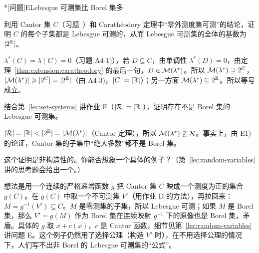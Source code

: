 \begin{probleme}*[问题]{E}{Lebesgue 可测集比 Borel 集多}
\begin{questions}
\item 利用 Cantor 集 $C$（习题~）和 Carathéodory 定理中“零外测度集可测”的结论，证明 $C$ 的每个子集都是 Lebesgue 可测的，从而 Lebesgue 可测集的全体的基数为 $\lvert 2^{\mathbb{R}}\rvert$。
\begin{solution}
$\lambda^*(C)=\lambda(C)=0$（习题 A4-1)），若 $D\subseteq C$，由单调性 $\lambda^*(D)=0$，由定理~\ref{thm:extension:caratheodory} 的最后一句，$D\in\mathcal{M}(\lambda^*)$。所以 $\mathcal{M}(\lambda^*)\supseteq2^C$，$\lvert \mathcal{M}(\lambda^*)\rvert\geqslant\lvert 2^C\rvert=\lvert 2^{\mathbb{R}}\rvert$（由 A4-3)，$\lvert C\rvert=\lvert \mathbb{R}\rvert$）；另一方面 $\mathcal{M}(\lambda^*)\subseteq2^{\mathbb{R}}$。所以等号成立。
\end{solution}
\item 结合第~\ref{lec:set-systems} 讲作业 F（$\lvert \mathcal{R}\rvert=\lvert \mathbb{R}\rvert$），证明存在不是 Borel 集的 Lebesgue 可测集。
\begin{solution}
$\lvert \mathcal{R}\rvert=\lvert \mathbb{R}\rvert<\lvert 2^{\mathbb{R}}\rvert=\lvert \mathcal{M}(\lambda^*)\rvert$（Cantor 定理），所以 $\mathcal{M}(\lambda^*)\not\subseteq\mathcal{R}$。事实上，由 E1) 的论证，Cantor 集的子集中“绝大多数”都不是 Borel 集。
\end{solution}
\item 这个证明是非构造性的。你能否想象一个具体的例子？（第~\ref{lec:random-variables} 讲的思考题会给出一个。）
\begin{solution}
想法是用一个连续的严格递增函数 $g$ 把 Cantor 集 $C$ 映成一个测度为正的集合 $g(C)$。在 $g(C)$ 中取一个不可测集 $V'$（用作业 D 的方法），再拉回来：$M=g^{-1}(V')\subseteq C$。$M$ 是零测集的子集，所以 Lebesgue 可测；如果 $M$ 是 Borel 集，那么 $V'=g(M)$ 作为 Borel 集在连续映射 $g^{-1}$ 下的原像也是 Borel 集，矛盾。具体的 $g$ 取 $x+c(x)$，$c$ 是 Cantor 函数，细节见第~\ref{lec:random-variables} 讲问题 E。这个例子仍然用了选择公理（构造 $V'$ 时），在不用选择公理的情况下，人们写不出非 Borel 的 Lebesgue 可测集的“公式”。
\end{solution}
\end{questions}
\end{probleme}


